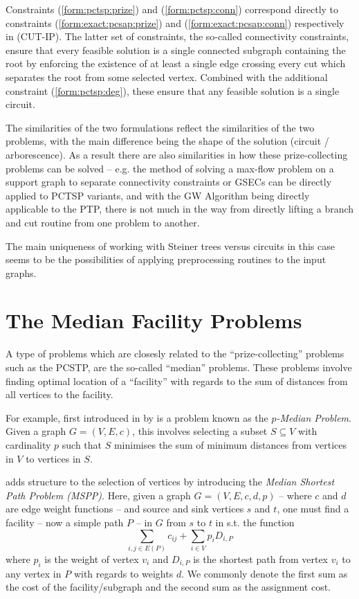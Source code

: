  Constraints (\ref{form:pctsp:prize}) and (\ref{form:pctsp:conn}) correspond directly to constraints
 (\ref{form:exact:pcsap:prize}) and (\ref{form:exact:pcsap:conn}) respectively in (CUT-IP).
 The latter set of constraints, the so-called connectivity constraints, ensure that every feasible solution
 is a single connected subgraph containing the root by enforcing the existence of at least a single edge crossing
 every cut which separates the root from some selected vertex. Combined with the
 additional constraint (\ref{form:pctsp:deg}), these ensure that any feasible solution is a single circuit.

 The similarities of the two formulations reflect the similarities of the two problems, with the main difference being
 the shape of the solution (circuit / arborescence).
 As a result there are also similarities in how these prize-collecting problems can be solved
 -- e.g. the method of solving a max-flow problem on a support graph
 to separate connectivity constraints or GSECs can be directly applied to PCTSP variants, and with the GW Algorithm being
 directly applicable to the PTP, there is not much in the way from directly lifting a branch and cut routine from
 one problem to another.

 The main uniqueness of working with Steiner trees versus circuits in this case seems to be the possibilities of applying
 preprocessing routines to the input graphs.

 \section{The Median Facility Problems}
 \label{sec:related:median}
 A type of problems which are closesly related to the ``prize-collecting'' problems such as the PCSTP, are the so-called
 ``median'' problems. These problems involve finding optimal location of a ``facility'' with regards to the sum
 of distances from all vertices to the facility.

 For example, first introduced in \citeyear{hakimi1964optimum} by \citet{hakimi1964optimum} is a problem known as
 the \textit{$p$-Median Problem}. Given a graph $G = (V, E, c)$, this involves selecting a subset $S \subseteq V$ with
 cardinality $p$ such that $S$ minimises the sum of minimum distances from vertices in $V$ to vertices in $S$.
 
 \citet{current1987median} adds structure to the selection of vertices by introducing the \textit{Median Shortest Path Problem (MSPP)}.
 Here, given a graph $G = (V,E,c,d,p)$ -- where $c$ and $d$ are edge weight functions --
 and source and sink vertices $s$ and $t$, one must find a facility
  -- now a simple path $P$ --  in $G$
 from $s$ to $t$ in s.t. the function
 $$\sum_{i,j \in E(P)} c_{ij} + \sum_{i \in V} p_i D_{i, P}$$
 where $p_i$ is the weight of vertex $v_i$ and
 $D_{i, P}$ is the shortest path from vertex $v_i$ to any vertex in $P$ with regards to
 weights $d$.
 We commonly denote the first sum as the cost of the facility/subgraph and the second sum as the assignment cost.

